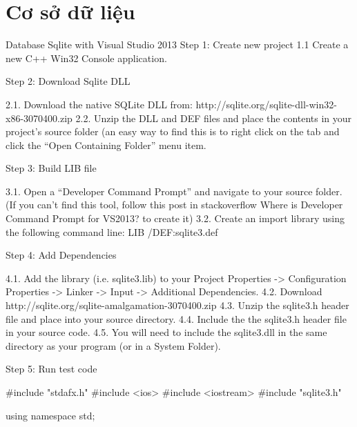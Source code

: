 \section{Cơ sở dữ liệu}


Database
Sqlite with Visual Studio 2013
Step 1: Create new project 1.1 Create a new C++ Win32 Console application.

Step 2: Download Sqlite DLL

2.1. Download the native SQLite DLL from: http://sqlite.org/sqlite-dll-win32-x86-3070400.zip 2.2. Unzip the DLL and DEF files and place the contents in your project’s source folder (an easy way to find this is to right click on the tab and click the “Open Containing Folder” menu item.

Step 3: Build LIB file

3.1. Open a “Developer Command Prompt” and navigate to your source folder. (If you can't find this tool, follow this post in stackoverflow Where is Developer Command Prompt for VS2013? to create it) 3.2. Create an import library using the following command line: LIB /DEF:sqlite3.def

Step 4: Add Dependencies

4.1. Add the library (i.e. sqlite3.lib) to your Project Properties -> Configuration Properties -> Linker -> Input -> Additional Dependencies. 4.2. Download http://sqlite.org/sqlite-amalgamation-3070400.zip 4.3. Unzip the sqlite3.h header file and place into your source directory. 4.4. Include the the sqlite3.h header file in your source code. 4.5. You will need to include the sqlite3.dll in the same directory as your program (or in a System Folder).

Step 5: Run test code

#include "stdafx.h"
#include <ios>
#include <iostream>
#include "sqlite3.h"

using namespace std;


